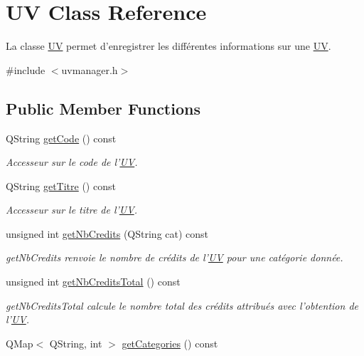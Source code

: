 \hypertarget{class_u_v}{\section{U\+V Class Reference}
\label{class_u_v}
}


La classe \hyperlink{class_u_v}{U\+V} permet d'enregistrer les différentes informations sur une \hyperlink{class_u_v}{U\+V}.  




{\ttfamily \#include $<$uvmanager.\+h$>$}

\subsection*{Public Member Functions}
\begin{DoxyCompactItemize}
\item 
Q\+String \hyperlink{class_u_v_a4d5fe39505b3e474b41013dda0d2047a}{get\+Code} () const 
\begin{DoxyCompactList}\small\item\em Accesseur sur le code de l'\hyperlink{class_u_v}{U\+V}. \end{DoxyCompactList}\item 
Q\+String \hyperlink{class_u_v_afa7f5a8c7ea21bedcd00af1a1ff48221}{get\+Titre} () const 
\begin{DoxyCompactList}\small\item\em Accesseur sur le titre de l'\hyperlink{class_u_v}{U\+V}. \end{DoxyCompactList}\item 
unsigned int \hyperlink{class_u_v_aca0cf43b1b3b5a7060b21a65fb5701c2}{get\+Nb\+Credits} (Q\+String cat) const 
\begin{DoxyCompactList}\small\item\em get\+Nb\+Credits renvoie le nombre de crédits de l'\hyperlink{class_u_v}{U\+V} pour une catégorie donnée. \end{DoxyCompactList}\item 
unsigned int \hyperlink{class_u_v_a9f95880400dac05e2d18513826062b14}{get\+Nb\+Credits\+Total} () const 
\begin{DoxyCompactList}\small\item\em get\+Nb\+Credits\+Total calcule le nombre total des crédits attribués avec l'obtention de l'\hyperlink{class_u_v}{U\+V}. \end{DoxyCompactList}\item 
Q\+Map$<$ Q\+String, int $>$ \hyperlink{class_u_v_ac9e4b2f7e639ac8d96d01fc8a33a730f}{get\+Categories} () const 

\end{DoxyCompactItemize}
